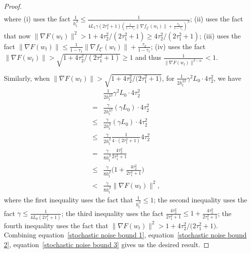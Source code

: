 \documentclass[10pt,a4paper]{amsart}
\def\eqref#1{equation~\ref{#1}}
\begin{document}
\begin{proof}
\begin{align}
        \label{stochastic noise bound 2}
    \end{align}
        where (i) uses the fact $\frac{1}{h_t^{\beta}}\leq \frac{1}{4L_1\gamma(2\tau_1^2+1)(\frac{1}{1-\tau_1}\|\nabla f_{\xi'}(w_t) \|+\frac{\tau_2}{1-\tau_1})^{\beta}}$;
        (ii) uses the fact that now $\|\nabla F(w_t) \|^2> 1+{4\tau_2^2}/{(2\tau_1^2+1)}\geq {4\tau_2^2}/{(2\tau_1^2+1)}$;
     (iii) uses the fact $\|\nabla F(w_t) \|\leq \frac{1}{1-\tau_1}\|\nabla f_{\xi'}(w_t) \|+\frac{\tau_2}{1-\tau_1}$; (iv) uses the fact $\big \|\nabla F(w_t) \big \| > \sqrt{1+{4\tau_2^2}/{(2\tau_1^2+1)}}\geq 1$ and thus $\frac{1}{\|\nabla F(w_t)  \|^{\beta-\alpha}}<1$.
    
    Similarly, when $\big \|\nabla F(w_t) \big \| > \sqrt{1+{4\tau_2^2}/{(2\tau_1^2+1})}$,  for $\frac{1}{2h_t^{2\beta}}\gamma^2 L_0 \cdot 4\tau_2^2$, we have
    \begin{align}
       &\frac{1}{2h_t^{2\beta}}\gamma^2 L_0 \cdot 4\tau_2^2 \nonumber\\
       =&\frac{\gamma}{2h_t^{2\beta}}(\gamma L_0) \cdot 4\tau_2^2 \nonumber\\
       \leq& \frac{\gamma}{2h_t^{\beta}}(\gamma L_0) \cdot 4\tau_2^2 \nonumber\\
       \leq& \frac{\gamma}{2h_t^{\beta}} \frac{1}{4\cdot(2\tau_1^2+1)}4\tau_2^2 \nonumber \\
       =& \frac{\gamma}{8h_t^{\beta}} \frac{4\tau_2^2}{2\tau_1^2+1} \nonumber \\
       \leq& \frac{\gamma}{8h_t^{\beta}} \Big(1+\frac{4\tau_2^2}{2\tau_1^2+1} \Big)\nonumber \\
       <& \frac{\gamma}{8h_t^{\beta}} \big \|\nabla F(w_t) \big \|^2,
       \label{stochastic noise bound 3}
    \end{align}
        where the first inequality uses the fact that $\frac{1}{h_t^{\beta}}\leq 1$; the second inequality uses the fact $\gamma \leq \frac{1}{4L_0(2\tau_1^2+1)}$; the third inequality uses the fact $\frac{4\tau_2^2}{2\tau_1^2+1}\leq 1+\frac{4\tau_2^2}{2\tau_1^2+1}$; the fourth inequality uses the fact that
        $\big \|\nabla F(w_t) \big \|^2 > 1+{4\tau_2^2}/{(2\tau_1^2}+1)$.
        Combining \eqref{stochastic noise bound 1}, \eqref{stochastic noise bound 2}, \eqref{stochastic noise bound 3} gives us the desired result.
\end{proof}
\end{document}
